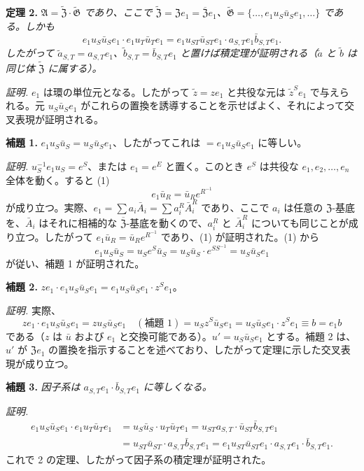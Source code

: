 \noindent\textbf{定理 2.} \emph{\(\mathfrak A=\widetilde{\mathfrak Z}\cdot\widetilde{\mathfrak G}\) であり、ここで \(\widetilde{\mathfrak Z}=\mathfrak Ze_1=\overline{\mathfrak Z}e_1\)、\(\widetilde{\mathfrak G}=\{\ldots,e_1u_S\bar u_Se_1,\ldots\}\) である。しかも}
\[
e_1u_S\bar u_Se_1\cdot e_1u_T\bar u_Te_1
=e_1u_{ST}\bar u_{ST}e_1\cdot a_{S,T}e_1\bar b_{S,T}e_1.
\]
\emph{したがって \(\tilde a_{S,T}=a_{S,T}e_1\)、\(\tilde b_{S,T}=\bar b_{S,T}e_1\) と置けば積定理が証明される（\(\tilde a\) と \(\tilde b\) は同じ体 \(\widetilde{\mathfrak Z}\) に属する）。}

\noindent\emph{証明.} \(e_1\) は環の単位元となる。したがって \(\tilde z=ze_1\) と共役な元は \(\tilde z^Se_1\) で与えられる。元 \(u_S\bar u_Se_1\) がこれらの置換を誘導することを示せばよく、それによって交叉表現が証明される。

\noindent\textbf{補題 1.} \(e_1u_S\bar u_S=u_S\bar u_Se_1\)、したがってこれは \(=e_1u_S\bar u_Se_1\) に等しい。

\noindent\emph{証明.} \(u_S^{-1}e_1u_S=e^S\)、または \(e_1=e^E\) と置く。このとき \(e^S\) は共役な \(e_1,e_2,\ldots,e_n\) 全体を動く。すると (1)
\[
e_1\bar u_R=\bar u_Re^{R^{-1}}
\]
が成り立つ。実際、\(e_1=\sum a_i\bar A_i=\sum a_i^R\bar A_i^R\) であり、ここで \(a_i\) は任意の \(\mathfrak Z\)-基底を、\(\bar A_i\) はそれに相補的な \(\overline{\mathfrak Z}\)-基底を動くので、\(a_i^R\) と \(\bar A_i^R\) についても同じことが成り立つ。したがって \(e_1\bar u_R=\bar u_Re^{R^{-1}}\) であり、(1) が証明された。(1) から
\[
e_1u_S\bar u_S=u_Se^S\bar u_S
=u_S\bar u_S\cdot e^{SS^{-1}}=u_S\bar u_Se_1
\]
が従い、補題 1 が証明された。

\noindent\textbf{補題 2.} \(ze_1\cdot e_1u_S\bar u_Se_1=e_1u_S\bar u_Se_1\cdot z^Se_1\)。

\noindent\emph{証明.} 実際、
\[
ze_1\cdot e_1u_S\bar u_Se_1
=zu_S\bar u_Se_1\quad(\text{補題 1})
=u_Sz^S\bar u_Se_1
=u_S\bar u_Se_1\cdot z^Se_1
\equiv b=e_1b
\]
である（\(z\) は \(\bar u\) および \(e_1\) と交換可能である）。\(u'=u_S\bar u_Se_1\) とする。補題 2 は、\(u'\) が \(\mathfrak Ze_1\) の置換を指示することを述べており、したがって定理に示した交叉表現が成り立つ。

\noindent\textbf{補題 3.} \emph{因子系は \(a_{S,T}e_1\cdot\bar b_{S,T}e_1\) に等しくなる。}

\noindent\emph{証明.}
\[
\begin{aligned}
e_1u_S\bar u_Se_1\cdot e_1u_T\bar u_Te_1
&=u_S\bar u_S\cdot u_T\bar u_Te_1
=u_{ST}a_{S,T}\cdot\bar u_{ST}\bar b_{S,T}e_1\\
&=u_{ST}\bar u_{ST}\cdot a_{S,T}\bar b_{S,T}e_1
=e_1u_{ST}\bar u_{ST}e_1\cdot a_{S,T}e_1\cdot\bar b_{S,T}e_1.
\end{aligned}
\]
これで 2 の定理、したがって因子系の積定理が証明された。


